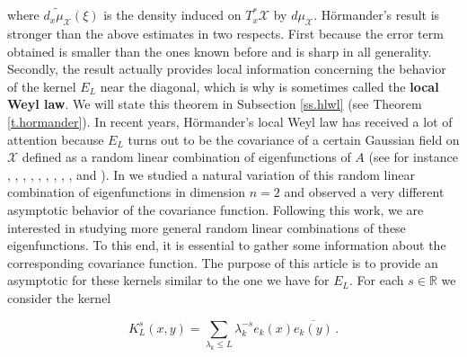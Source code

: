 \documentclass[10pt,twoside]{article}
\newcommand{\R}{\mathbb{R}}
\newcommand{\man}{\mathcal{X}}
\numberwithin{theorem}{section}
\begin{document}
where $\widetilde{d_x\mu_\man}(\xi)$ is the density induced on $T^*_x\man$ by $d\mu_\man$. H\"ormander's result is stronger than the above estimates in two respects. First because the error term obtained is smaller than the ones known before and is sharp in all generality. Secondly, the result actually provides local information concerning the behavior of the kernel $E_L$ near the diagonal, which is why is sometimes called the \textbf{local Weyl law}. We will state this theorem in Subsection \ref{ss.hlwl} (see Theorem \ref{t.hormander}). In recent years, H\"ormander's local Weyl law has received a lot of attention because $E_L$ turns out to be the covariance of a certain Gaussian field on $\man$ defined as a random linear combination of eigenfunctions of $A$ (see for instance \cite{ber85}, \cite{ns09}, \cite{zeld09}, \cite{gawe14}, \cite{let14}, \cite{gawe15}, \cite{nyri15}, \cite{hzz151}, \cite{ns15},\cite{sawi} and \cite{casa17}). In \cite{ale161} we studied a natural variation of this random linear combination of eigenfunctions in dimension $n=2$ and observed a very different asymptotic behavior of the covariance function. Following this work, we are interested in studying more general random linear combinations of these eigenfunctions. To this end, it is essential to gather some information about the corresponding covariance function. The purpose of this article is to provide an asymptotic for these kernels similar to the one we have for $E_L$. For each $s\in\R$ we consider the kernel

\[
K_L^s(x,y)=\sum_{\lambda_k\leq L} \lambda_k^{-s} e_k(x)\overline{e_k(y)}\, .
\]
\end{document}
